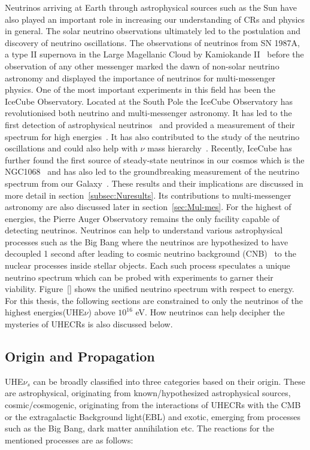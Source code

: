 Neutrinos arriving at Earth through astrophysical sources such as the Sun have also played an important role in increasing our understanding of CRs and physics in general. The solar neutrino observations ultimately led to the postulation and discovery of neutrino oscillations. The observations of neutrinos from SN 1987A, a type II supernova in the Large Magellanic Cloud by Kamiokande II~\cite{PhysRevLett.58.1490} before the observation of any other messenger marked the dawn of non-solar neutrino astronomy and displayed the importance of neutrinos for multi-messenger physics. One of the most important experiments in this field has been the IceCube Observatory. Located at the South Pole the IceCube Observatory has revolutionised both neutrino and multi-messenger astronomy. It has led to the first detection of astrophysical neutrinos~\cite{PhysRevLett.111.021103} and provided a measurement of their spectrum for high energies~\cite{doi:10.1126/science.1242856}. It has also contributed to the study of the neutrino oscillations\cite{Abbasi_2023_Oscillation} and could also help with $\nu$ mass hierarchy~\cite{psf2023008007}. Recently, IceCube has further found the first source of steady-state neutrinos in our cosmos which is the NGC1068~\cite{Icecube_2022} and has also led to the groundbreaking measurement of the neutrino spectrum from our Galaxy~\cite{Galactic_plane_nu_2023}. These results and their implications are discussed in more detail in section~\ref{subsec:Nuresults}. Its contributions to multi-messenger astronomy are also discussed later in section~\ref{sec:Mul-mes}. For the highest of energies, the Pierre Auger Observatory remains the only facility capable of detecting neutrinos. 
Neutrinos can help to understand various astrophysical processes such as the Big Bang where the neutrinos are hypothesized to have decoupled 1 second after leading to cosmic neutrino background (CNB)~\cite{scott2024cosmicneutrinobackground} to the nuclear processes inside stellar objects. Each such process speculates a unique neutrino spectrum which can be probed with experiments to garner their viability. Figure~\ref{} shows the unified neutrino spectrum with respect to energy. For this thesis, the following sections are constrained to only the neutrinos of the highest energies(UHE$\nu$) above $10^16$ eV. How neutrinos can help decipher the mysteries of UHECRs is also discussed below.


\subsection{Origin and Propagation}
\label{subsec:nuorig}
UHE$\nu_s$ can be broadly classified into three categories based on their origin. These are astrophysical, originating from known/hypothesized astrophysical sources, cosmic/cosmogenic, originating from the interactions of UHECRs with the CMB or the extragalactic Background light(EBL) and exotic, emerging from processes such as the Big Bang, dark matter annihilation etc. The reactions for the mentioned processes are as follows:


